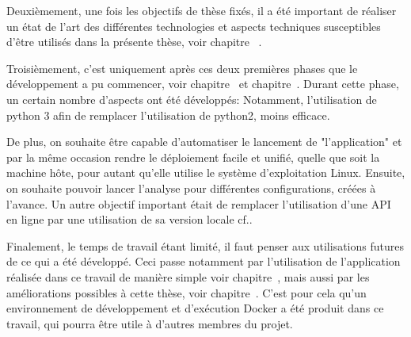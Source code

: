 Deuxièmement, une fois les objectifs de thèse fixés, il a été important de réaliser un état de l'art des différentes technologies et aspects techniques susceptibles d'être utilisés dans la présente thèse, voir chapitre~ .

Troisièmement, c'est uniquement après ces deux premières phases que le développement a pu commencer, voir chapitre~ et chapitre~.
Durant cette phase, un certain nombre d'aspects ont été développés:
Notamment, l'utilisation de python 3 afin de remplacer l'utilisation de python2, moins efficace.

De plus, on souhaite être capable d'automatiser le lancement de "l'application" et par la même occasion rendre le déploiement facile et unifié, quelle que soit la machine hôte, pour autant qu'elle utilise le système d'exploitation Linux. Ensuite, on souhaite pouvoir lancer l'analyse pour différentes configurations, créées à l'avance. Un autre objectif important était de remplacer l'utilisation d'une API en ligne par une utilisation de sa version locale cf..

Finalement, le temps de travail étant limité, il faut penser aux utilisations futures de ce qui a été développé. Ceci passe notamment par l'utilisation de l'application réalisée dans ce travail de manière simple voir chapitre~, mais aussi par les améliorations possibles à cette thèse, voir chapitre~. C'est pour cela qu'un environnement de développement et d'exécution Docker a été produit dans ce travail, qui pourra être utile à d'autres membres du projet. 

